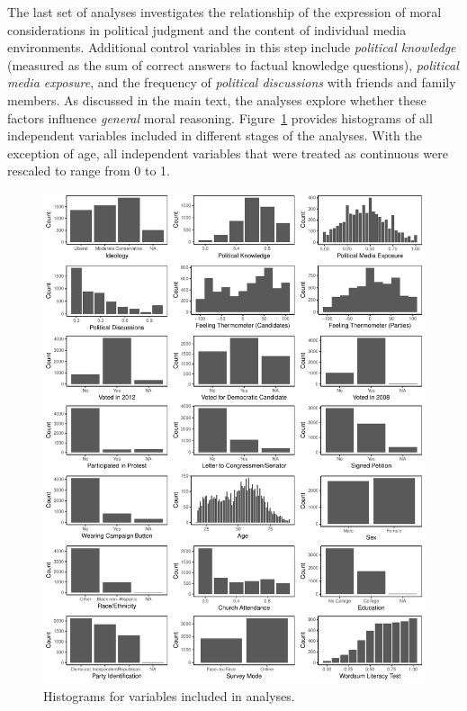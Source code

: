 \documentclass[12pt]{article}
\begin{document}
The last set of analyses investigates the relationship of the expression of moral considerations in political judgment and the content of individual media environments. Additional control variables in this step include \textit{political knowledge} (measured as the sum of correct answers to factual knowledge questions), \textit{political media exposure}, and the frequency of \textit{political discussions} with friends and family members. As discussed in the main text, the analyses explore whether these factors influence \textit{general} moral reasoning. Figure~\ref{fig:app_desc} provides histograms of all independent variables included in different stages of the analyses. With the exception of age, all independent variables that were treated as continuous were rescaled to range from 0 to 1.

\begin{figure}[h]\centering
\includegraphics[width=\textwidth]{../calc/fig/app_desc.pdf}
\caption{Histograms for variables included in analyses.}\label{fig:app_desc}
\end{figure}
\end{document}
